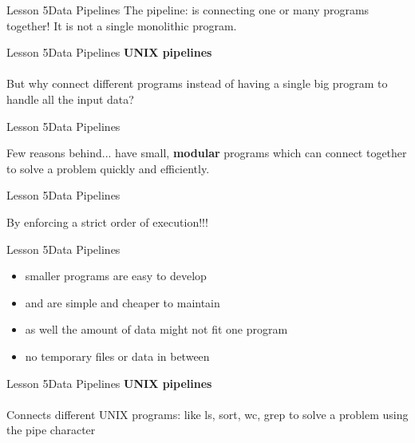 \documentclass[aspectratio=1610]{beamer}
\begin{document}
\begin{frame}{Lesson 5}{Data Pipelines}
\Huge
The pipeline: is connecting one or many programs together! It is not 
a single monolithic program.
\end{frame}


\begin{frame}{Lesson 5}{Data Pipelines}
\LARGE
\textbf{UNIX pipelines}\\~\\
\Huge
But why connect different programs instead of having a single big 
program to handle all the input data?
\end{frame}


\begin{frame}{Lesson 5}{Data Pipelines}
\Huge
\begin{center}
Few reasons behind... have small, \textbf{modular} programs which 
can connect together to solve a problem quickly and efficiently.
\end{center}
\end{frame}

\begin{frame}{Lesson 5}{Data Pipelines}
\Huge
\begin{center}
By \alert{enforcing} a strict \alert{order} of execution!!!
\end{center}
\end{frame}


\begin{frame}{Lesson 5}{Data Pipelines}
\huge
\begin{itemize}
    \item smaller programs are easy to develop 
    \item and are simple and cheaper to maintain
    \item as well the amount of data might not fit one program
    \item no temporary files or data in between
\end{itemize}
\end{frame}


\begin{frame}
\end{frame}



\begin{frame}{Lesson 5}{Data Pipelines}
\LARGE
\textbf{UNIX pipelines}\\~\\
Connects different UNIX programs: like ls, sort, wc, grep to solve a problem using the \text{\textbar} pipe character
\end{frame}
\end{document}
